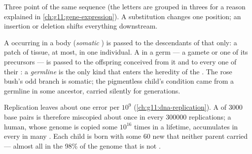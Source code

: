 \begin{omfigure}

{\small Three point  of the same sequence (the letters are
grouped in threes for a reason explained in
\cref{ch:g11:gene-expression}). A substitution changes one position;
an insertion or deletion shifts everything downstream.}
\end{omfigure}

\begin{proposition}\label{prop:g11:mutations:where}
A  occurring in a body  (\emph{somatic }) is passed
to the descendants of that  only: a patch of tissue, at most, in
one individual. A  in a germ  --- a gamete or one of its
precursors --- is passed to the offspring conceived from it and to
every one of their : a \emph{germline } is the only kind
that enters the heredity of the . The rose bush's odd branch
is somatic; the pigmentless child's condition came from a germline
 in some ancestor, carried silently for generations.
\end{proposition}
\admitted

\begin{example}\label{ex:g11:mutations:frequency}
Replication leaves about one error per $10^9$ 
(\cref{ch:g11:dna-replication}). A  of $\num{3000}$ base pairs is
therefore miscopied about once in every $\num{300000}$ replications;
a human, whose genome is copied some $10^{16}$ times in a lifetime,
accumulates  in every  in many . Each child is born
with some 60 new  that neither parent carried --- almost all
in the 98\% of the genome that is not .
\end{example}

